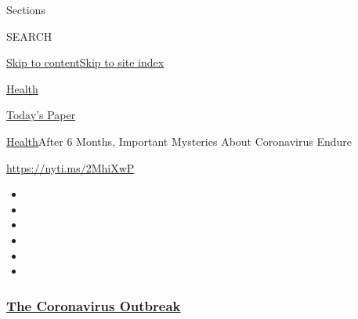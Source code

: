 Sections

SEARCH

\protect\hyperlink{site-content}{Skip to
content}\protect\hyperlink{site-index}{Skip to site index}

\href{https://www.nytimes3xbfgragh.onion/section/health}{Health}

\href{https://myaccount.nytimes3xbfgragh.onion/auth/login?response_type=cookie\&client_id=vi}{}

\href{https://www.nytimes3xbfgragh.onion/section/todayspaper}{Today's
Paper}

\href{/section/health}{Health}\textbar{}After 6 Months, Important
Mysteries About Coronavirus Endure

\url{https://nyti.ms/2MhiXwP}

\begin{itemize}
\item
\item
\item
\item
\item
\item
\end{itemize}

\hypertarget{the-coronavirus-outbreak}{%
\subsubsection{\texorpdfstring{\href{https://www.nytimes3xbfgragh.onion/news-event/coronavirus?name=styln-coronavirus-national\&region=TOP_BANNER\&variant=undefined\&block=storyline_menu_recirc\&action=click\&pgtype=Article\&impression_id=dfebfb20-e398-11ea-88e1-ed0daa705d1f}{The
Coronavirus
Outbreak}}{The Coronavirus Outbreak}}\label{the-coronavirus-outbreak}}

